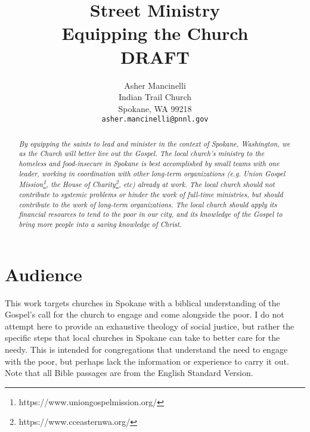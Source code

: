 \documentclass[12pt]{article}
\title{Street Ministry \\
        \large Equipping the Church \\
        \ifdefined\isedit
        \large DRAFT
        \fi}
\author{Asher Mancinelli \\
        Indian Trail Church \\
        Spokane, WA 99218 \\
        \texttt{asher.mancinelli@pnnl.gov} \\ }
\begin{document}
\maketitle

\begin{abstract}
    \textit{
    By equipping the saints to lead and minister in the context of Spokane, Washington, we as the Church will better live out the Gospel.
    The local church's ministry to the homeless and food-insecure in Spokane is best accomplished by small teams with one leader, working in coordination with other long-term organizations (e.g. Union Gospel Mission\footnote{https://www.uniongospelmission.org/}, the House of Charity\footnote{https://www.cceasternwa.org/}, etc) already at work.
    The local church should not contribute to systemic problems or hinder the work of full-time ministries, but should contribute to the work of long-term organizations.
    The local church should apply its financial resources to tend to the poor in our city, and its knowledge of the Gospel to bring more people into a saving knowledge of Christ.
    }
\end{abstract}


\clearpage

\section{Audience}

    This work targets churches in Spokane with a biblical understanding of the Gospel's call for the church to engage and come alongside the poor.
    I do not attempt here to provide an exhaustive theology of social justice, but rather the specific steps that local churches in Spokane can take to better care for the needy.
    This is intended for congregations that understand the need to engage with the poor, but perhaps lack the information or experience to carry it out.
    Note that all Bible passages are from the English Standard Version\cite{esv2016}.
\end{document}
